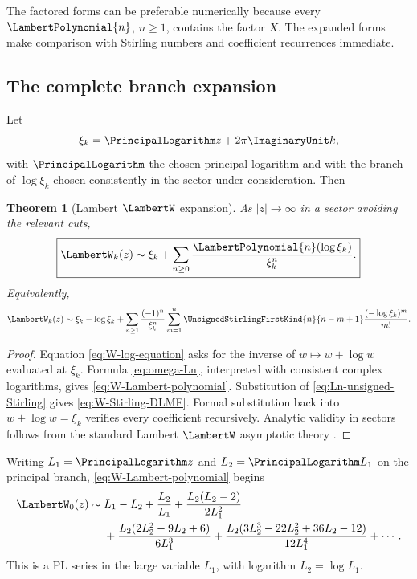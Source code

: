 \documentclass[11pt,oneside]{article}
\numberwithin{equation}{section}
\newtheorem{theorem}{Theorem}[section]
\theoremstyle{definition}
\newcommand{\as}{\sim}
\begin{document}
The factored forms can be preferable numerically because every \(\LambertPolynomial{n}\),
\(n\ge1\), contains the factor \(X\).  The expanded forms make comparison with
Stirling numbers and coefficient recurrences immediate.

\subsection{The complete branch expansion}

Let
\begin{equation}\label{eq:xi-k}
  \xi_k=\PrincipalLogarithm z+2\pi \ImaginaryUnit k,
\end{equation}
with \(\PrincipalLogarithm\) the chosen principal logarithm and with the branch of
\(\log\xi_k\) chosen consistently in the sector under consideration.  Then
\begin{theorem}[Lambert \(\LambertW\) expansion]\label{thm:W-expansion}
As \(|z|\to\infty\) in a sector avoiding the relevant cuts,
\begin{equation}\label{eq:W-Lambert-polynomial}
\boxed{
  \LambertW_k(z)\as \xi_k+
  \sum_{n\ge0}\frac{\LambertPolynomial{n}(\log\xi_k)}{\xi_k^n}.
}
\end{equation}
Equivalently,
\begin{equation}\label{eq:W-Stirling-DLMF}
  \LambertW_k(z)\as\xi_k-\log\xi_k
  +\sum_{n\ge1}\frac{(-1)^n}{\xi_k^n}
    \sum_{m=1}^n
      \UnsignedStirlingFirstKind{n}{n-m+1}
      \frac{(-\log\xi_k)^m}{m!}.
\end{equation}
\end{theorem}

\begin{proof}
Equation \eqref{eq:W-log-equation} asks for the inverse of
\(w\mapsto w+\log w\) evaluated at \(\xi_k\).  Formula
\eqref{eq:omega-Ln}, interpreted with consistent complex logarithms, gives
\eqref{eq:W-Lambert-polynomial}.  Substitution of
\eqref{eq:Ln-unsigned-Stirling} gives
\eqref{eq:W-Stirling-DLMF}.  Formal substitution back into
\(w+\log w=\xi_k\) verifies every coefficient recursively.  Analytic validity in
sectors follows from the standard Lambert \(\LambertW\) asymptotic theory
\cite{Corless1996,DLMFLambert}.
\end{proof}

Writing \(L_1=\PrincipalLogarithm z\) and \(L_2=\PrincipalLogarithm L_1\) on the principal branch,
\eqref{eq:W-Lambert-polynomial} begins
\begin{align}
 \LambertW_0(z)\as{}&L_1-L_2+\frac{L_2}{L_1}
 +\frac{L_2(L_2-2)}{2L_1^2}\nonumber\\
 &+\frac{L_2(2L_2^2-9L_2+6)}{6L_1^3}
 +\frac{L_2(3L_2^3-22L_2^2+36L_2-12)}{12L_1^4}
 +\cdots.
 \label{eq:W-standard-expanded}
\end{align}
This is a PL series in the large variable \(L_1\), with logarithm
\(L_2=\log L_1\).
\end{document}
